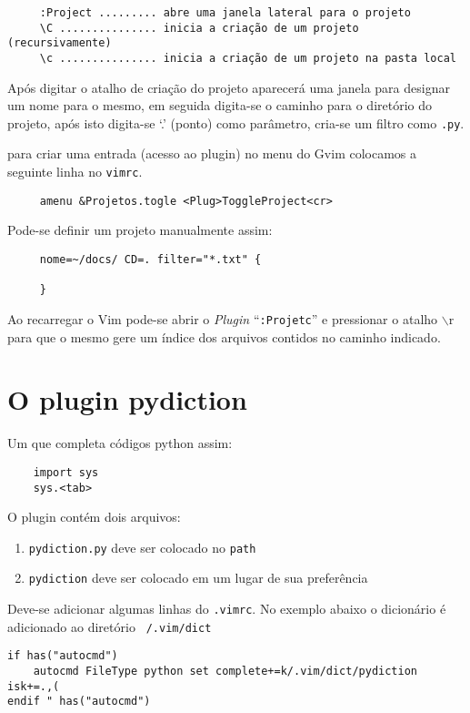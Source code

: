 \begin{verbatim}
     :Project ......... abre uma janela lateral para o projeto
     \C ............... inicia a criação de um projeto (recursivamente)
     \c ............... inicia a criação de um projeto na pasta local
\end{verbatim}

Após digitar o atalho de criação do projeto aparecerá uma janela para designar um nome
para o mesmo, em seguida digita-se o caminho para o diretório do projeto, após isto
digita-se `.' (ponto) como parâmetro, cria-se um filtro como {\tt *.py}.


para criar uma entrada (acesso ao plugin) no menu do Gvim colocamos
a seguinte linha no {\tt vimrc}.

\begin{verbatim}
     amenu &Projetos.togle <Plug>ToggleProject<cr>
\end{verbatim}

Pode-se definir um projeto manualmente assim:

\begin{verbatim}
     nome=~/docs/ CD=. filter="*.txt" {

     }
\end{verbatim}

Ao recarregar o Vim pode-se abrir o {\em Plugin} ``{\tt :Projetc}'' e 
pressionar o atalho $\backslash$r para que o mesmo gere um índice dos arquivos
contidos no caminho indicado.
   

\section{O plugin pydiction}
\label{sec:O plugin pydiction}

Um que completa códigos python assim:

\begin{verbatim}
    import sys
    sys.<tab>
\end{verbatim}

O plugin contém dois arquivos:

\begin{enumerate}
    \item {\tt pydiction.py} deve ser colocado no {\tt path}
    \item {\tt pydiction} deve ser colocado em um lugar de sua preferência
\end{enumerate}

Deve-se adicionar algumas linhas do {\tt .vimrc}.
No exemplo abaixo o dicionário é adicionado ao diretório {\tt ~/.vim/dict}
\begin{verbatim}
if has("autocmd")
    autocmd FileType python set complete+=k/.vim/dict/pydiction isk+=.,(
endif " has("autocmd") 
\end{verbatim}

